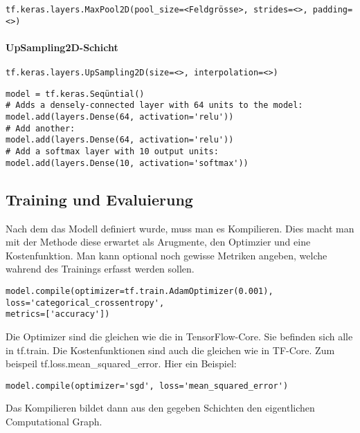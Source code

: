 \begin{verbatim}
tf.keras.layers.MaxPool2D(pool_size=<Feldgrösse>, strides=<>, padding=<>)
\end{verbatim}


\paragraph{UpSampling2D-Schicht}

\begin{verbatim}
tf.keras.layers.UpSampling2D(size=<>, interpolation=<>)
\end{verbatim}


\begin{verbatim}
model = tf.keras.Seqüntial()
# Adds a densely-connected layer with 64 units to the model:
model.add(layers.Dense(64, activation='relu'))
# Add another:
model.add(layers.Dense(64, activation='relu'))
# Add a softmax layer with 10 output units:
model.add(layers.Dense(10, activation='softmax'))
\end{verbatim}


\subsection{Training und Evaluierung}

Nach dem das Modell definiert wurde, muss man es Kompilieren.
Dies macht man mit der Methode  diese erwartet als
Arugmente, den Optimzier und eine Kostenfunktion. Man kann optional noch gewisse
Metriken angeben, welche wahrend des Trainings erfasst werden sollen.
\begin{verbatim}
model.compile(optimizer=tf.train.AdamOptimizer(0.001),
loss='categorical_crossentropy',
metrics=['accuracy'])
\end{verbatim}
Die Optimizer sind die gleichen wie die in TensorFlow-Core. Sie befinden sich
alle in tf.train. Die Kostenfunktionen sind auch die gleichen wie in TF-Core.
Zum beispeil tf.loss.mean\_squared\_error.
\para{}
Hier ein Beispiel:
\begin{verbatim}
model.compile(optimizer='sgd', loss='mean_squared_error')
\end{verbatim}
Das Kompilieren bildet dann aus den gegeben Schichten den eigentlichen
Computational Graph.

